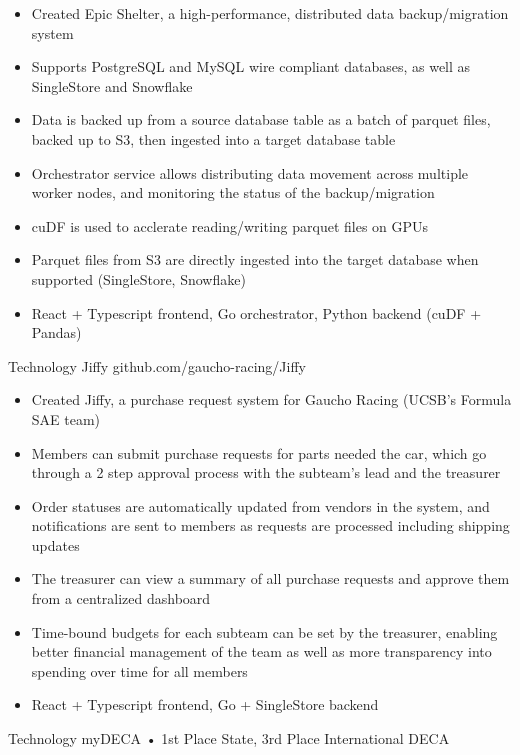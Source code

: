 \documentclass[9pt]{developercv} %
\begin{document}
\begin{entrylist}
{\begin{itemize}[noitemsep,topsep=0pt,parsep=0pt,partopsep=0pt, leftmargin=10pt]
            \item Created Epic Shelter, a high-performance, distributed data backup/migration system
            \item Supports PostgreSQL and MySQL wire compliant databases, as well as SingleStore and Snowflake
            \item Data is backed up from a source database table as a batch of parquet files, backed up to S3, then ingested into a target database table
            \item Orchestrator service allows distributing data movement across multiple worker nodes, and monitoring the status of the backup/migration
            \item cuDF is used to acclerate reading/writing parquet files on GPUs
            \item Parquet files from S3 are directly ingested into the target database when supported (SingleStore, Snowflake)
            \item React + Typescript frontend, Go orchestrator, Python backend (cuDF + Pandas)
        \end{itemize}}
    \entry
		{Technology}
		{Jiffy}
		{github.com/gaucho-racing/Jiffy}
		{\vspace{-8pt}
        \begin{itemize}[noitemsep,topsep=0pt,parsep=0pt,partopsep=0pt, leftmargin=10pt]
            \item Created Jiffy, a purchase request system for Gaucho Racing (UCSB's Formula SAE team)
            \item Members can submit purchase requests for parts needed the car, which go through a 2 step approval process with the subteam's lead and the treasurer
            \item Order statuses are automatically updated from vendors in the system, and notifications are sent to members as requests are processed including shipping updates
            \item The treasurer can view a summary of all purchase requests and approve them from a centralized dashboard
            \item Time-bound budgets for each subteam can be set by the treasurer, enabling better financial management of the team as well as more transparency into spending over time for all members
            \item React + Typescript frontend, Go + SingleStore backend
        \end{itemize}}
    \entry
		{Technology}
		{myDECA • 1st Place State, 3rd Place International DECA}

\end{entrylist}
\end{document}
